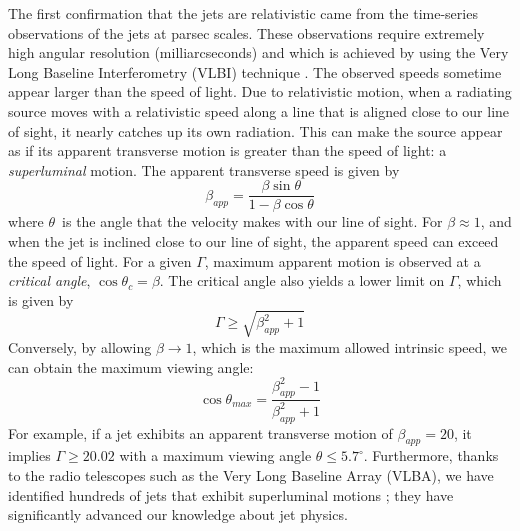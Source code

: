 The first confirmation that the jets are relativistic came from the time-series observations of the jets at parsec scales. These observations require extremely high angular resolution (milliarcseconds) and which is achieved by using the Very Long Baseline Interferometry (VLBI) technique \citep{cohen1971small}. The observed speeds sometime appear larger than the speed of light. Due to relativistic motion, when a radiating source moves with a relativistic speed along a line that is aligned close to our line of sight, it nearly catches up its own radiation. This can make the source appear as if its apparent transverse motion is greater than the speed of light: a \textit{superluminal} motion. The apparent transverse speed is given by
\begin{equation}
    \beta_{app}=\frac{\beta\sin{\theta}}{1-\beta\cos{\theta}}
\end{equation}
where $\theta$~is the angle that the velocity makes with our line of sight.
For $\beta\approx1$, and when the jet is inclined close to our line of sight, the apparent speed can exceed the speed of light. For a given $\Gamma$, maximum apparent motion is observed at a \textit{critical angle}, $\cos{\theta_c}=\beta$. The critical angle also yields a lower limit on $\Gamma$, which is given by
\begin{equation}
    \Gamma\geq\sqrt{\beta_{app}^2+1}
\end{equation}
Conversely, by allowing $\beta\to1$, which is the maximum allowed intrinsic speed, we can obtain the maximum viewing angle:
\begin{equation}
    \cos{\theta_{max}}=\frac{\beta_{app}^2-1}{\beta_{app}^2+1}
\end{equation}
For example, if a jet exhibits an apparent transverse motion of $\beta_{app}=20$, it implies $\Gamma\geq20.02$ with a maximum viewing angle $\theta\leq5.7^\circ$.
Furthermore, thanks to the radio telescopes such as the Very Long Baseline Array (VLBA), we have identified hundreds of jets that exhibit superluminal motions \citep[e.g.,][]{2018ApJS..234...12L}; they have significantly advanced our knowledge about jet physics.











